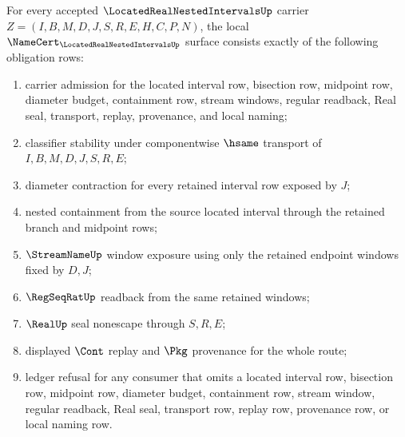 \begin{theorem}
\label{thm:located-real-nested-intervals-namecert-obligations}
For every accepted $\LocatedRealNestedIntervalsUp$ carrier $Z=(I,B,M,D,J,S,R,E,H,C,P,N)$, the local $\NameCert_{\LocatedRealNestedIntervalsUp}$ surface consists exactly of the following obligation rows:
\begin{enumerate}
\item carrier admission for the located interval row, bisection row, midpoint row, diameter budget, containment row, stream windows, regular readback, Real seal, transport, replay, provenance, and local naming;
\item classifier stability under componentwise $\hsame$ transport of $I,B,M,D,J,S,R,E$;
\item diameter contraction for every retained interval row exposed by $J$;
\item nested containment from the source located interval through the retained branch and midpoint rows;
\item $\StreamNameUp$ window exposure using only the retained endpoint windows fixed by $D,J$;
\item $\RegSeqRatUp$ readback from the same retained windows;
\item $\RealUp$ seal nonescape through $S,R,E$;
\item displayed $\Cont$ replay and $\Pkg$ provenance for the whole route;
\item ledger refusal for any consumer that omits a located interval row, bisection row, midpoint row, diameter budget, containment row, stream window, regular readback, Real seal, transport row, replay row, provenance row, or local naming row.
\end{enumerate}
\end{theorem}
